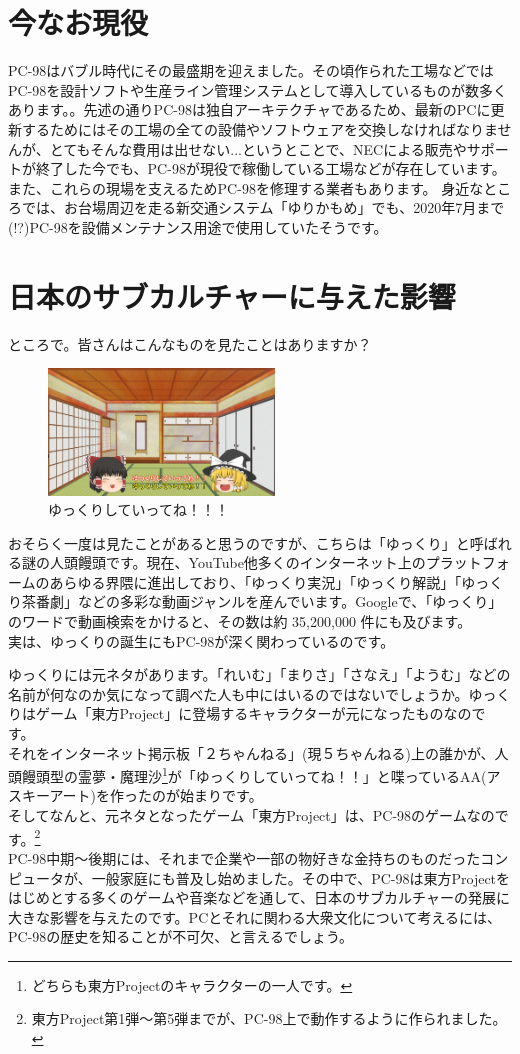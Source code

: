 \documentclass[b5paper,9pt,platex,dvipdfmx]{jsarticle}
\begin{document}
\begin{multicols*}{3}
\section[short]{今なお現役}
PC-98はバブル時代にその最盛期を迎えました。その頃作られた工場などではPC-98を設計ソフトや生産ライン管理システムとして導入しているものが数多くあります。。先述の通りPC-98は独自アーキテクチャであるため、最新のPCに更新するためにはその工場の全ての設備やソフトウェアを交換しなければなりませんが、とてもそんな費用は出せない...というとことで、NECによる販売やサポートが終了した今でも、PC-98が現役で稼働している工場などが存在しています。また、これらの現場を支えるためPC-98を修理する業者もあります。
身近なところでは、お台場周辺を走る新交通システム「ゆりかもめ」でも、2020年7月まで(!?)PC-98を設備メンテナンス用途で使用していたそうです。
\section[short]{日本のサブカルチャーに与えた影響}
ところで。皆さんはこんなものを見たことはありますか？
\begin{figure}[H]
  \centering
  \includegraphics[width=6cm]{img-1.png}
  \caption{ゆっくりしていってね！！！}
\end{figure}
  おそらく一度は見たことがあると思うのですが、こちらは「ゆっくり」と呼ばれる謎の人頭饅頭です。現在、YouTube他多くのインターネット上のプラットフォームのあらゆる界隈に進出しており、「ゆっくり実況」「ゆっくり解説」「ゆっくり茶番劇」などの多彩な動画ジャンルを産んでいます。Googleで、「ゆっくり」のワードで動画検索をかけると、その数は約 35,200,000 件にも及びます。\\
実は、ゆっくりの誕生にもPC-98が深く関わっているのです。

ゆっくりには元ネタがあります。「れいむ」「まりさ」「さなえ」「ようむ」などの名前が何なのか気になって調べた人も中にはいるのではないでしょうか。ゆっくりはゲーム「東方Project」に登場するキャラクターが元になったものなのです。\\
それをインターネット掲示板「２ちゃんねる」(現５ちゃんねる)上の誰かが、人頭饅頭型の霊夢・魔理沙\footnote{どちらも東方Projectのキャラクターの一人です。}が「ゆっくりしていってね！！」と喋っているAA(アスキーアート)を作ったのが始まりです。\\
そしてなんと、元ネタとなったゲーム「東方Project」は、PC-98のゲームなのです。\footnote{東方Project第1弾～第5弾までが、PC-98上で動作するように作られました。}\\
PC-98中期～後期には、それまで企業や一部の物好きな金持ちのものだったコンピュータが、一般家庭にも普及し始めました。その中で、PC-98は東方Projectをはじめとする多くのゲームや音楽などを通して、日本のサブカルチャーの発展に大きな影響を与えたのです。PCとそれに関わる大衆文化について考えるには、PC-98の歴史を知ることが不可欠、と言えるでしょう。

\end{multicols*}
\end{document}

